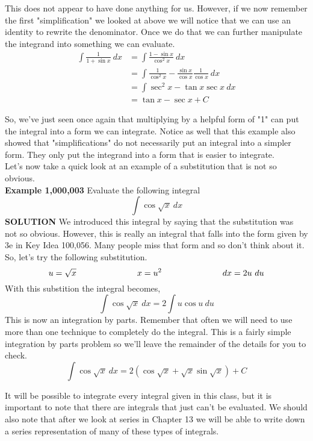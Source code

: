 \documentclass[11pt]{report}
\newlength\tindent
\renewcommand{\indent}{\hspace*{\tindent}}
\begin{document}
This does not appear to have done anything for us. However, if we now remember the first "simplification" we looked at above we will notice that we can use an identity to rewrite the denominator. Once we do that we can further manipulate the integrand into something we can evaluate.
\begin{align*}
\int \frac{1}{1+\sin x}~dx &= \int \frac{1-\sin x}{\cos^2 x}~dx \\
&= \int \frac{1}{\cos^2 x} - \frac{\sin x}{\cos x}\frac{1}{\cos x}~dx \\
&= \int \sec^2 x - \tan x \sec x~dx \\
&= \tan x - \sec x +C
\end{align*}

So, we've just seen once again that multiplying by a helpful form of "1" can put the integral into a form we can integrate. Notice as well that this example also showed that "simplifications" do not necessarily put an integral into a simpler form. They only put the integrand into a form that is easier to integrate.\\

Let's now take a quick look at an example of a substitution that is not so obvious.\\

\textbf{Example 1,000,003} \indent Evaluate the following integral
$$\int \cos \sqrt x~dx$$
\textbf{SOLUTION} \indent We introduced this integral by saying that the substitution was not so obvious. However, this is really an integral that falls into the form given by 3e in Key Idea 100,056. Many people miss that form and so don't think about it. So, let's try the following substitution.
$$u = \sqrt x \hskip 1 truein x=u^2 \hskip 1 truein dx=2u~du$$
With this substition the integral becomes,
$$\int \cos \sqrt x~dx = 2\int u \cos u~du$$
This is now an integration by parts. Remember that often we will need to use more than one technique to completely do the integral. This is a fairly simple integration by parts problem so we'll leave the remainder of the details for you to check.
$$\int \cos \sqrt x~dx =2(\cos \sqrt x + \sqrt x \sin \sqrt x) + C$$

It will be possible to integrate every integral given in this class, but it is important to note that there are integrals that just can't be evaluated. We should also note that after we look at series in Chapter 13 we will be able to write down a series representation of many of these types of integrals.\\
\end{document}
